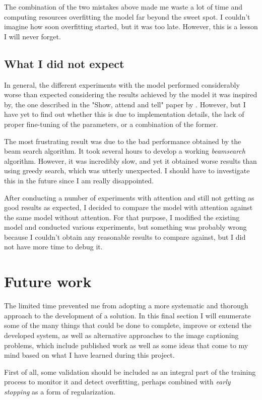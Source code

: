 The combination of the two mistakes above made me waste a lot of time and computing resources overfitting the model far beyond the sweet spot. I couldn't imagine how soon overfitting started, but it was too late. However, this is a lesson I will never forget. 

\subsection{What I did not expect}

In general, the different experiments with the model performed considerably worse than expected considering the results achieved by the model it was inspired by, the one described in the "Show, attend and tell" paper by \citet{Xu2015}. However, but I have yet to find out whether this is due to implementation details, the lack of proper fine-tuning of the parameters, or a combination of the former.

The most frustrating result was due to the bad performance obtained by the beam search algorithm. It took several hours to develop a working \textit{beamsearch} algorithm. However, it was incredibly slow, and yet it obtained worse results than using greedy search, which was utterly unexpected. I should have to investigate this in the future since I am really disappointed.

After conducting a number of experiments with attention and still not getting as good results as expected, I decided to compare the model with attention against the same model without attention. For that purpose, I modified the existing model and conducted various experiments, but something was probably wrong because I couldn't obtain any reasonable results to compare against, but I did not have more time to debug it.

\section{Future work}

The limited time prevented me from adopting a more systematic and thorough approach to the development of a solution. In this final section I will enumerate some of the many things that could be done to complete, improve or extend the developed system, as well as alternative approaches to the image captioning problems, which include published work as well as some ideas that come to my mind based on what I have learned during this project.

First of all, some validation should be included as an integral part of the training process to monitor it and detect overfitting, perhaps combined with \textit{early stopping} as a form of regularization.

